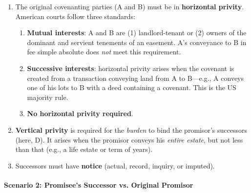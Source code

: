 \begin{enumerate}
\begin{enumerate}
        always enforced.\footnote{Casebook p. 874.}
        \item ``The touch and concern requirement has been criticized as being 
        vague and unpredictable, based upon obscure reasoning, and interfering 
        with the intent of the parties.''\footnote{Casebook p. 874.}
        \item The Restatement (Third) supersedes the touch and concern 
        requirement and assumes that covenants are valid unless it violates 
        public policy. It allows subsequent invalidity based on changed 
        circumstances.\footnote{Casebook pp. 874--75.}
    \end{enumerate}
    \item The original covenanting parties (A and B) must be in 
    \textbf{horizontal privity}. American courts follow three standards:
    \begin{enumerate}
        \item \textbf{Mutual interests}: A and B are (1) landlord-tenant or 
        (2) owners of the dominant and servient tenements of an easement. A's 
        conveyance to B in fee simple absolute does \emph{not} meet this 
        requirement.
        \item \textbf{Successive interests}: horizontal privity arises when 
        the covenant is created from a transaction conveying land from A to 
        B---e.g., A conveys one of his lots to B with a deed containing a 
        covenant. This is the US majority rule.
        \item \textbf{No horizontal privity required}.
    \end{enumerate}
    \item \textbf{Vertical privity} is required for the \emph{burden} to bind 
    the promisor's successors (here, D). It arises when the promisor conveys 
    his \emph{entire estate}, but not less than that (e.g., a life estate or 
    term of years).
    \item Successors must have \textbf{notice} (actual, record, inquiry, or 
    imputed).
\end{enumerate}

\paragraph{Scenario 2: Promisee's Successor vs. Original Promisor}

